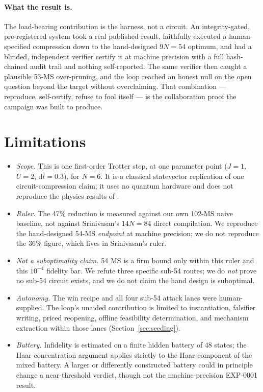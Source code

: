 \documentclass[11pt]{article}
\begin{document}
\paragraph{What the result is.} The load-bearing contribution is the harness, not a
circuit. An integrity-gated, pre-registered system took a real published result,
faithfully executed a human-specified compression down to the hand-designed $9N=54$
optimum, and had a blinded, independent verifier certify it at machine precision with
a full hash-chained audit trail and nothing self-reported. The same verifier then
caught a plausible 53-MS over-pruning, and the loop reached an honest null on the
open question beyond the target without overclaiming. That combination --- reproduce,
self-certify, refuse to fool itself --- is the collaboration proof the campaign was
built to produce.

\section{Limitations}
\label{sec:limitations}

\begin{itemize}
\item \emph{Scope.} This is one first-order Trotter step, at one parameter point
($J=1$, $U=2$, $\mathrm{d}t=0.3$), for $N=6$. It is a classical statevector
replication of one circuit-compression claim; it uses no quantum hardware and does
not reproduce the physics results of \cite{Srinivasan2024}.
\item \emph{Ruler.} The 47\% reduction is measured against our own 102-MS naive
baseline, not against Srinivasan's $14N=84$ direct compilation. We reproduce the
hand-designed 54-MS \emph{endpoint} at machine precision; we do not reproduce the
36\% figure, which lives in Srinivasan's ruler.
\item \emph{Not a suboptimality claim.} 54 MS is a firm bound only within this ruler
and this $10^{-4}$ fidelity bar. We refute three specific sub-54 routes; we do
\emph{not} prove no sub-54 circuit exists, and we do not claim the hand design is
suboptimal.
\item \emph{Autonomy.} The win recipe and all four sub-54 attack lanes were
human-supplied. The loop's unaided contribution is limited to instantiation,
falsifier writing, priced reopening, offline feasibility determination, and
mechanism extraction within those lanes (Section~\ref{sec:seeding}).
\item \emph{Battery.} Infidelity is estimated on a finite hidden battery of 48
states; the Haar-concentration argument applies strictly to the Haar component of the
mixed battery. A larger or differently constructed battery could in principle change a
near-threshold verdict, though not the machine-precision EXP-0001 result.
\end{itemize}
\end{document}
